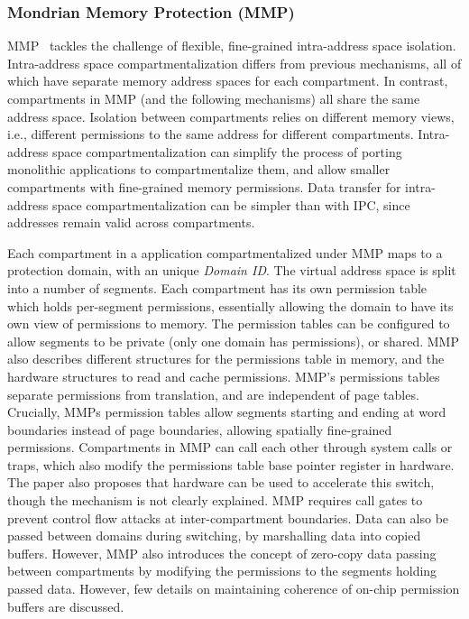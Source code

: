 \subsubsection{Mondrian Memory Protection (MMP)}
MMP~\cite{WitchelCA02MMP} tackles the challenge of flexible, 
fine-grained intra-address space isolation.
Intra-address space compartmentalization differs from previous mechanisms,
all of which have separate memory address spaces for each compartment.
In contrast, compartments in MMP (and the following mechanisms) all share the
same address space.
Isolation between compartments relies on different 
memory views, i.e., different permissions to the same address for 
different compartments.
Intra-address space compartmentalization can simplify the process of
porting monolithic applications to compartmentalize them, and allow
smaller compartments with fine-grained memory permissions.
Data transfer for intra-address space compartmentalization can be simpler
than with IPC, since addresses remain valid across compartments.

Each compartment in a application compartmentalized under MMP maps to a protection
domain, with an unique \emph{Domain ID}.
The virtual address space is split into a number of segments.
Each compartment has its own permission table which holds per-segment permissions,
essentially allowing the domain to have its own view of permissions to memory.
The permission tables can be configured to allow segments to be private (only one 
domain has permissions), or shared.
MMP also describes different structures for the permissions table in memory, and
the hardware structures to read and cache permissions.
MMP's permissions tables separate permissions from translation, and are
independent of page tables.
Crucially, MMPs permission tables allow segments starting and ending at
word boundaries instead of page boundaries, allowing spatially fine-grained
permissions.
Compartments in MMP can call each other through system calls or traps, 
which also modify the permissions table base pointer register in hardware.
The paper also proposes that hardware can be used to accelerate this switch,
though the mechanism is not clearly explained.
MMP requires call gates to prevent control flow attacks at inter-compartment
boundaries.
Data can also be passed between domains during switching, by marshalling
data into copied buffers.
However, MMP also introduces the concept of zero-copy data passing between
compartments by modifying the permissions to the segments holding passed data.
However, few details on maintaining coherence of on-chip permission buffers 
are discussed.

